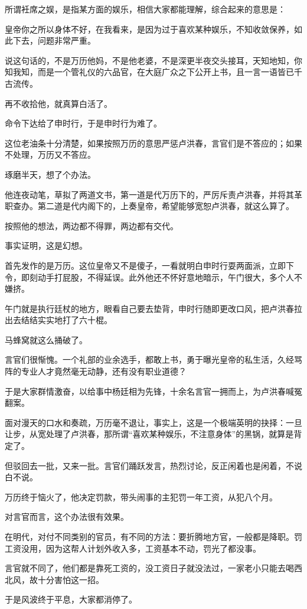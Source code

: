 \begin{multicols}{\theparacolNo}
所谓衽席之娱，是指某方面的娱乐，相信大家都能理解，综合起来的意思是：

皇帝你之所以身体不好，在我看来，是因为过于喜欢某种娱乐，不知收敛保养，如此下去，问题非常严重。

说这句话的，不是万历他妈，不是他老婆，不是深更半夜交头接耳，天知地知，你知我知，而是一个管礼仪的六品官，在大庭广众之下公开上书，且一言一语皆已千古流传。

再不收拾他，就真算白活了。

命令下达给了申时行，于是申时行为难了。

这位老油条十分清楚，如果按照万历的意思严惩卢洪春，言官们是不答应的；如果不处理，万历又不答应。

琢磨半天，想了个办法。

他连夜动笔，草拟了两道文书，第一道是代万历下的，严厉斥责卢洪春，并将其革职查办。第二道是代内阁下的，上奏皇帝，希望能够宽恕卢洪春，就这么算了。

按照他的想法，两边都不得罪，两边都有交代。

事实证明，这是幻想。

首先发作的是万历。这位皇帝又不是傻子，一看就明白申时行耍两面派，立即下令，即刻动手打屁股，不得延误。此外他还不怀好意地暗示，午门很大，多个人不嫌挤。

午门就是执行廷杖的地方，眼看自己要去垫背，申时行随即更改口风，把卢洪春拉出去结结实实地打了六十棍。

马蜂窝就这么捅破了。

言官们很惭愧。一个礼部的业余选手，都敢上书，勇于曝光皇帝的私生活，久经骂阵的专业人才竟然毫无动静，还有没有职业道德？

于是大家群情激奋，以给事中杨廷相为先锋，十余名言官一拥而上，为卢洪春喊冤翻案。

面对漫天的口水和奏疏，万历毫不退让，事实上，这是一个极端英明的抉择：一旦让步，从宽处理了卢洪春，那所谓“喜欢某种娱乐，不注意身体”的黑锅，就算是背定了。

但驳回去一批，又来一批。言官们踊跃发言，热烈讨论，反正闲着也是闲着，不说白不说。

万历终于恼火了，他决定罚款，带头闹事的主犯罚一年工资，从犯八个月。

对言官而言，这个办法很有效果。

在明代，对付不同类别的官员，有不同的方法：要折腾地方官，一般都是降职。罚工资没用，因为这帮人计划外收入多，工资基本不动，罚光了都没事。

言官就不同了，他们都是靠死工资的，没工资日子就没法过，一家老小只能去喝西北风，故十分害怕这一招。

于是风波终于平息，大家都消停了。


\end{multicols}

